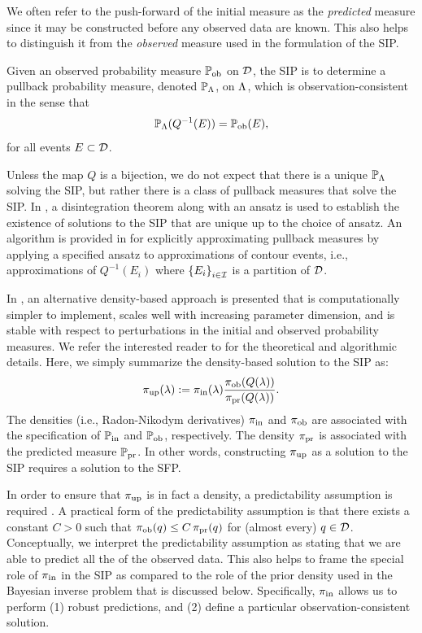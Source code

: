 We often refer to the push-forward of the initial measure as the {\em predicted} measure since it may be constructed before any observed data are known.
This also helps to distinguish it from the {\em observed} measure used in the formulation of the SIP.
\begin{definition}\label{def:inverse-problem}
Given an observed probability measure $\operatorname*{\mathbb{P}_{ob}}$ on $\mathcal{D}$, the SIP is to determine a pullback probability measure, denoted $\mathbb{P}_{\Lambda}$, on ${\Lambda}$, which is observation-consistent in the sense that
\begin{equation}\label{eq:data-consistent}
\mathbb{P}_{\Lambda}(Q^{-1}(E)) = \operatorname*{\mathbb{P}_{ob}}(E),
\end{equation}
for all events $E\subset\mathcal{D}$.
\end{definition}

Unless the map $Q$ is a bijection, we do not expect that there is a unique $\mathbb{P}_{\Lambda}$ solving the SIP, but rather there is a class of pullback measures that solve the SIP.
In \cite{BET+14}, a disintegration theorem \cite{Chang_Pollard} along with an ansatz is used to establish the existence of solutions to the SIP that are unique up to the choice of ansatz.
An algorithm is provided in \cite{BET+14} for explicitly approximating pullback measures by applying a specified ansatz to approximations of contour events, i.e., approximations of $Q^{-1}(E_i)$ where $\left\{E_i\right\}_{i\in\mathcal{I}}$ is a partition of $\mathcal{D}$.

In \cite{BJW18a}, an alternative density-based approach is presented that is computationally simpler to implement, scales well with increasing parameter dimension, and is stable with respect to perturbations in the initial and observed probability measures.
We refer the interested reader to \cite{BJW18a} for the theoretical and algorithmic details.
Here, we simply summarize the density-based solution to the SIP as:
\begin{equation}\label{eq:updated-pdf}
	\operatorname*{\pi_{up}}(\lambda) := \operatorname*{\pi_{in}}(\lambda)\frac{\operatorname*{\pi_{ob}}(Q(\lambda))}{\operatorname*{\pi_{pr}}(Q(\lambda))}.
\end{equation}
The densities (i.e., Radon-Nikodym derivatives) $\operatorname*{\pi_{in}}$ and $\operatorname*{\pi_{ob}}$ are associated with the specification of $\operatorname*{\mathbb{P}_{in}}$ and $\operatorname*{\mathbb{P}_{ob}}$, respectively.
The density $\operatorname*{\pi_{pr}}$ is associated with the predicted measure $\operatorname*{\mathbb{P}_{pr}}$.
In other words, constructing $\operatorname*{\pi_{up}}$ as a solution to the SIP requires a solution to the SFP.

In order to ensure that $\operatorname*{\pi_{up}}$ is in fact a density, a predictability assumption is required \cite{BJW18a}.
A practical form of the predictability assumption is that there exists a constant $C>0$ such that $\operatorname*{\pi_{ob}}(q)\leq C\operatorname*{\pi_{pr}}(q)$ for (almost every) $q\in\mathcal{D}$.
Conceptually, we interpret the predictability assumption as stating that we are able to predict all the of the observed data.
This also helps to frame the special role of $\operatorname*{\pi_{in}}$ in the SIP as compared to the role of the prior density used in the Bayesian inverse problem that is discussed below.
Specifically, $\operatorname*{\pi_{in}}$ allows us to perform (1) robust predictions, and (2) define a particular observation-consistent solution.

